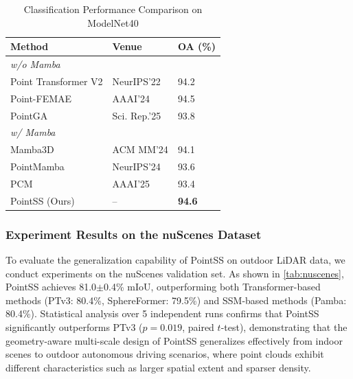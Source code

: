 \documentclass[a4paper,fleqn]{cas-sc}
\begin{document}
\begin{table}
	\centering
	\caption{Classification Performance Comparison on ModelNet40}
	\label{tab:ModelNet}
	\begin{tabular}{@{}lll@{}}
		\toprule
		\textbf{Method} & \textbf{Venue} & \textbf{OA (\%)} \\ \midrule
		\multicolumn{3}{l}{\textit{w/o Mamba}} \\
		Point Transformer V2 \cite{ptv2} & NeurIPS'22 & 94.2 \\
		Point-FEMAE \cite{FEMAE} & AAAI'24 & 94.5 \\
		PointGA \cite{pointga} & Sci. Rep.'25 & 93.8 \\ \midrule
		\multicolumn{3}{l}{\textit{w/ Mamba}} \\
		Mamba3D \cite{Mamba3D} & ACM MM'24 & 94.1 \\
		PointMamba \cite{PointMamba} & NeurIPS'24 & 93.6 \\
		PCM \cite{pcm} & AAAI'25 & 93.4 \\
		PointSS (Ours) & -- & \textbf{94.6} \\ \bottomrule
	\end{tabular}
\end{table}

\subsubsection{Experiment Results on the nuScenes Dataset}

To evaluate the generalization capability of PointSS on outdoor LiDAR data, we conduct experiments on the nuScenes validation set. As shown in \cref{tab:nuscenes}, PointSS achieves 81.0$\pm$0.4\% mIoU, outperforming both Transformer-based methods (PTv3: 80.4\%, SphereFormer: 79.5\%) and SSM-based methods (Pamba: 80.4\%). Statistical analysis over 5 independent runs confirms that PointSS significantly outperforms PTv3 ($p=0.019$, paired $t$-test), demonstrating that the geometry-aware multi-scale design of PointSS generalizes effectively from indoor scenes to outdoor autonomous driving scenarios, where point clouds exhibit different characteristics such as larger spatial extent and sparser density.
\end{document}

